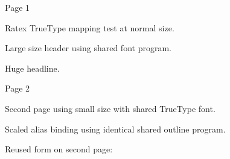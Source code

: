\documentclass{article}
\edef\sharedformref{\the\pdflastxform}
\def\putsharedform{\pdfrefxform\sharedformref}
\def\putsharedform{\copy\sharedformbox}
\begin{document}
{\Large\noindent Page 1\par}
{\normalsize Ratex TrueType mapping test at normal size.}

{\Large Large size header using shared font program.}

{\Huge Huge headline.}

\bigskip
\putsharedform

\clearpage

{\Large\noindent Page 2\par}
{\small Second page using small size with shared TrueType font.}

{\sharedalias Scaled alias binding using identical shared outline program.}

\bigskip
Reused form on second page:

\putsharedform
\end{document}
